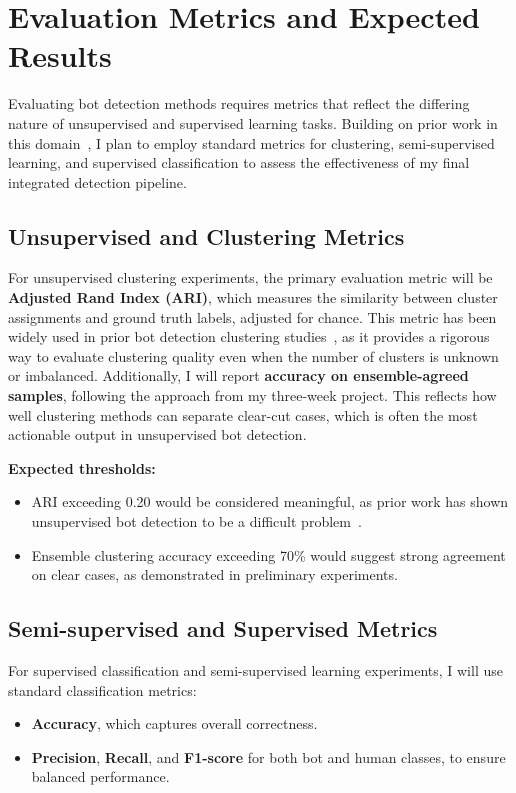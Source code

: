 \documentclass[10pt,twocolumn]{article}
\begin{document}
\section{Evaluation Metrics and Expected Results}

Evaluating bot detection methods requires metrics that reflect the differing nature of unsupervised and supervised learning tasks. Building on prior work in this domain~\cite{cresci2017paradigm,varol2017online,Grimme2018changing,Hayawi2023social}, I plan to employ standard metrics for clustering, semi-supervised learning, and supervised classification to assess the effectiveness of my final integrated detection pipeline.

\subsection{Unsupervised and Clustering Metrics}

For unsupervised clustering experiments, the primary evaluation metric will be \textbf{Adjusted Rand Index (ARI)}, which measures the similarity between cluster assignments and ground truth labels, adjusted for chance. This metric has been widely used in prior bot detection clustering studies~\cite{Grimme2018changing,Yang2023anatomy}, as it provides a rigorous way to evaluate clustering quality even when the number of clusters is unknown or imbalanced. Additionally, I will report \textbf{accuracy on ensemble-agreed samples}, following the approach from my three-week project. This reflects how well clustering methods can separate clear-cut cases, which is often the most actionable output in unsupervised bot detection.

\textbf{Expected thresholds:}
\begin{itemize}
    \item ARI exceeding 0.20 would be considered meaningful, as prior work has shown unsupervised bot detection to be a difficult problem~\cite{Yang2023anatomy}.
    \item Ensemble clustering accuracy exceeding 70\% would suggest strong agreement on clear cases, as demonstrated in preliminary experiments.
\end{itemize}

\subsection{Semi-supervised and Supervised Metrics}

For supervised classification and semi-supervised learning experiments, I will use standard classification metrics:
\begin{itemize}
    \item \textbf{Accuracy}, which captures overall correctness.
    \item \textbf{Precision}, \textbf{Recall}, and \textbf{F1-score} for both bot and human classes, to ensure balanced performance.
\end{itemize}
\end{document}
